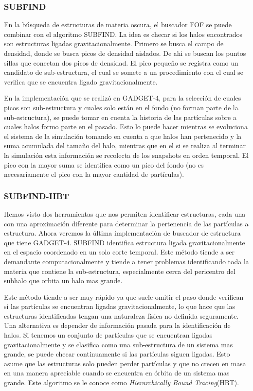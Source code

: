 \subsubsection{SUBFIND}
En la búsqueda de estructuras de materia oscura, el buscador FOF se puede combinar con el algoritmo SUBFIND. La idea es checar si los halos encontrados son estructuras ligadas gravitacionalmente. Primero se busca el campo de densidad, donde se busca picos de densidad aislados. De ahi se buscan los puntos sillas que conectan dos picos de densidad. El pico pequeño se registra como un candidato de sub-estructura, el cual se somete a un procedimiento con el cual se verifica que se encuentra ligado gravitacionalmente. 

En la implementación que se realizó en GADGET-4, para la selección de cuales picos son sub-estructura y cuales solo están en el fondo (no forman parte de la sub-estructura), se puede tomar en cuenta la historia de las partículas sobre a cuales halos formo parte en el pasado. Esto lo puede hacer mientras se evoluciona el sistema de la simulación tomando en cuenta a que halos han pertenecido y la suma acumulada del tamaño del halo, mientras que en el si se realiza al terminar la simulación esta información se recolecta de los snapshots en orden temporal. El pico con la mayor suma se identifica como un pico del fondo (no es necesariamente el pico con la mayor cantidad de partículas).

\subsubsection{SUBFIND-HBT}
Hemos visto dos herramientas que nos permiten identificar estructuras, cada una con una aproximación diferente para determinar la pertenencia de las partículas a estructura. Ahora veremos la última implementación de buscador de estructura que tiene GADGET-4. SUBFIND identifica estructura ligada gravitacionalmente en el espacio coordenado en un solo corte temporal. Este método tiende a ser demandante computacionalmente y tiende a tener problemas identificando toda la materia que contiene la sub-estructura, especialmente cerca del pericentro del subhalo que orbita un halo mas grande. 

Este método tiende a ser muy rápido ya que suele omitir el paso donde verifican si las partículas se encuentran ligadas gravitacionalmente, lo que hace que las estructuras identificadas tengan una naturaleza física no definida seguramente. Una alternativa es depender de información pasada para la identificación de halos. Si tenemos un conjunto de partículas que se encuentran ligadas gravitacionalmente y se clasifica como una sub-estructura de un sistema mas grande, se puede checar continuamente si las partículas siguen ligadas. Esto asume que las estructuras solo pueden perder partículas y que no crecen en masa en una manera apreciable cuando se encuentra en órbita de un sistema mas grande. Este algoritmo se le conoce como \textit{Hierarchically Bound Tracing}(HBT).

